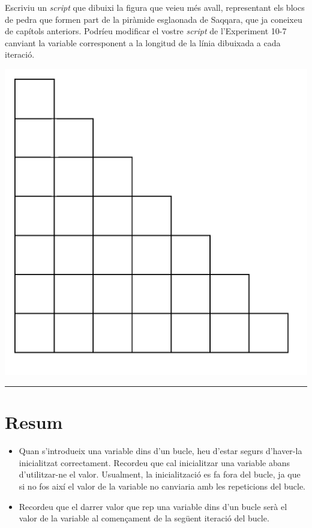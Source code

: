 \begin{center}
\colorbox{black}{}
\end{center}
{\small
\noindent
Escriviu un \emph{script} que dibuixi la figura que veieu més avall, representant els blocs de pedra que formen part de la piràmide esglaonada de Saqqara, que ja coneixeu de capítols anteriors. Podríeu modificar el vostre \emph{script} de l'Experiment 10-7 canviant la variable corresponent a la longitud de la línia dibuixada a cada iteració.}
\begin{center}
\includegraphics[scale=0.45]{Imatges/figuraE10-7.png}
\end{center}
\noindent
\rule{\textwidth}{3pt}
\newpage
\section{Resum}
\begin{itemize}
\item Quan s'introdueix una variable dins d'un bucle, heu d'estar segurs d'haver-la inicialitzat correctament. Recordeu que cal inicialitzar una variable abans d'utilitzar-ne el valor. Usualment, la inicialització es fa fora del bucle, ja que si no fos així el valor de la variable no canviaria amb les repeticions del bucle.
\item Recordeu que el darrer valor que rep una variable dins d'un bucle serà el valor de la variable al començament de la següent iteració del bucle.
\end{itemize}

